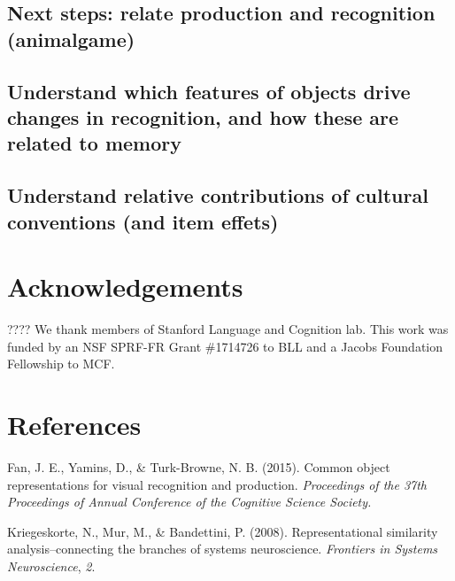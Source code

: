 \documentclass[10pt, letterpaper]{article}
\begin{document}
\subsection{Next steps: relate production and recognition
(animalgame)}\label{next-steps-relate-production-and-recognition-animalgame}

\subsection{Understand which features of objects drive changes in
recognition, and how these are related to
memory}\label{understand-which-features-of-objects-drive-changes-in-recognition-and-how-these-are-related-to-memory}

\subsection{Understand relative contributions of cultural conventions
(and item
effets)}\label{understand-relative-contributions-of-cultural-conventions-and-item-effets}

\vspace{1em}

\vspace{1em}

\section{Acknowledgements}\label{acknowledgements}

???? We thank members of Stanford Language and Cognition lab. This work
was funded by an NSF SPRF-FR Grant \#1714726 to BLL and a Jacobs
Foundation Fellowship to MCF.

\section{References}\label{references}

\setlength{\parindent}{-0.1in} \setlength{\leftskip}{0.125in} \noindent

\hypertarget{refs}{}
\hypertarget{ref-fan2015common}{}
Fan, J. E., Yamins, D., \& Turk-Browne, N. B. (2015). Common object
representations for visual recognition and production. \emph{Proceedings
of the 37th Proceedings of Annual Conference of the Cognitive Science
Society.}

\hypertarget{ref-kriegeskorte2008RSA}{}
Kriegeskorte, N., Mur, M., \& Bandettini, P. (2008). Representational
similarity analysis--connecting the branches of systems neuroscience.
\emph{Frontiers in Systems Neuroscience}, \emph{2}.
\end{document}

